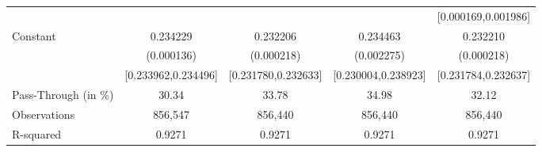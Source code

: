 {\begin{tabular}{l*{4}{c}}
                    &                     &                     &                     &[0.000169,0.001986]         \\
Constant            &    0.234229\sym{***}&    0.232206\sym{***}&    0.234463\sym{***}&    0.232210\sym{***}\\
                    &  (0.000136)         &  (0.000218)         &  (0.002275)         &  (0.000218)         \\
                    &[0.233962,0.234496]         &[0.231780,0.232633]         &[0.230004,0.238923]         &[0.231784,0.232637]         \\
\midrule
Pass-Through (in \%)&       30.34         &       33.78         &       34.98         &       32.12         \\
Observations        &     856,547         &     856,440         &     856,440         &     856,440         \\
R-squared           &      0.9271         &      0.9271         &      0.9271         &      0.9271         \\
\bottomrule
\end{tabular}
}
